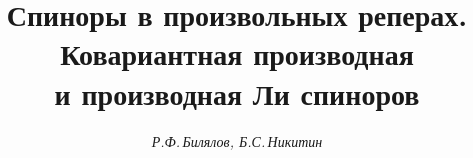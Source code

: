 













\newcommand{\Spin}{\operatorname{Spin}}




\newcommand{\tts}[1]{}


\renewcommand{\baselinestretch}{1.06}










\setcounter{page}{9}












\author{\it Р.Ф.\,Билялов, Б.С.\,Никитин}




\title{Спиноры в произвольных реперах.\\


Ковариантная производная \\


и производная Ли спиноров}





\date{}







